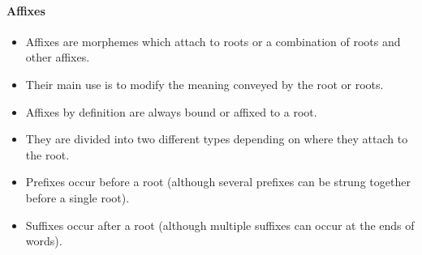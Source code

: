 \documentclass[12pt]{article}
\begin{document}
\paragraph{Affixes}
\begin{itemize}
\item Affixes are morphemes which attach to roots or a combination of roots and other affixes. 
\item Their main use is to modify the meaning conveyed by the root or roots.
\item Affixes by definition are always bound or affixed to a root. 
\item They are divided into two different types depending on where they attach to the root.
\item \color{blue}Prefixes \color{black}occur before a root (although several prefixes can be strung together before a single root).
\item \color{blue}Suffixes \color{black}occur after a root (although multiple suffixes can occur at the ends of words).
\end{itemize}
\end{document}
